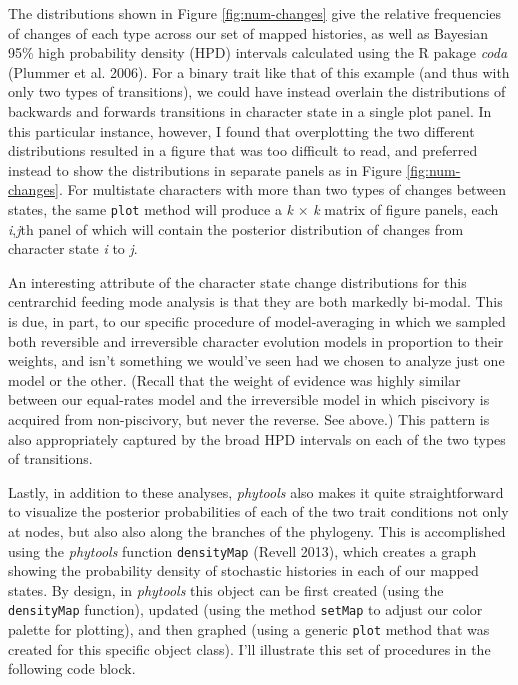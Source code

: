 \documentclass[fleqn,10pt,lineno]{wlpeerj} %
\begin{document}
The distributions shown in Figure \ref{fig:num-changes} give the relative frequencies of changes of each type across our set of mapped histories, as well as Bayesian 95\% high probability density (HPD) intervals calculated using the R pakage \emph{coda} (Plummer et al. 2006). For a binary trait like that of this example (and thus with only two types of transitions), we could have instead overlain the distributions of backwards and forwards transitions in character state in a single plot panel. In this particular instance, however, I found that overplotting the two different distributions resulted in a figure that was too difficult to read, and preferred instead to show the distributions in separate panels as in Figure \ref{fig:num-changes}. For multistate characters with more than two types of changes between states, the same \texttt{plot} method will produce a \emph{k} \(\times\) \emph{k} matrix of figure panels, each \emph{i},\emph{j}th panel of which will contain the posterior distribution of changes from character state \emph{i} to \emph{j}.

An interesting attribute of the character state change distributions for this centrarchid feeding mode analysis is that they are both markedly bi-modal. This is due, in part, to our specific procedure of model-averaging in which we sampled both reversible and irreversible character evolution models in proportion to their weights, and isn't something we would've seen had we chosen to analyze just one model or the other. (Recall that the weight of evidence was highly similar between our equal-rates model and the irreversible model in which piscivory is acquired from non-piscivory, but never the reverse. See above.) This pattern is also appropriately captured by the broad HPD intervals on each of the two types of transitions.

Lastly, in addition to these analyses, \emph{phytools} also makes it quite straightforward to visualize the posterior probabilities of each of the two trait conditions not only at nodes, but also also along the branches of the phylogeny. This is accomplished using the \emph{phytools} function \texttt{densityMap} (Revell 2013), which creates a graph showing the probability density of stochastic histories in each of our mapped states. By design, in \emph{phytools} this object can be first created (using the \texttt{densityMap} function), updated (using the method \texttt{setMap} to adjust our color palette for plotting), and then graphed (using a generic \texttt{plot} method that was created for this specific object class). I'll illustrate this set of procedures in the following code block.
\end{document}
